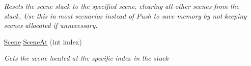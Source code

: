 \begin{DoxyCompactItemize}
\begin{DoxyCompactList}\small\item\em Resets the scene stack to the specified scene, clearing all other scenes from the stack. Use this in most scenarios instead of Push to save memory by not keeping scenes allocated if unnecessary. \end{DoxyCompactList}\item 
\hyperlink{class_m_b2_d_1_1_scenes_1_1_scene}{Scene} \hyperlink{class_m_b2_d_1_1_scenes_1_1_scene_stack_a84b1a5b2771f6c663eece04bcafd5416}{Scene\+At} (int index)
\begin{DoxyCompactList}\small\item\em Gets the scene located at the specific index in the stack \end{DoxyCompactList}\end{DoxyCompactItemize}
